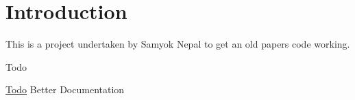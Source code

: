 \hypertarget{index_intro_sec}{}\section{Introduction}\label{index_intro_sec}
This is a project undertaken by Samyok Nepal to get an old paper\textquotesingle{}s code working.

\begin{DoxyRefDesc}{Todo}
\item[\hyperlink{todo__todo000001}{Todo}]Better Documentation \end{DoxyRefDesc}
